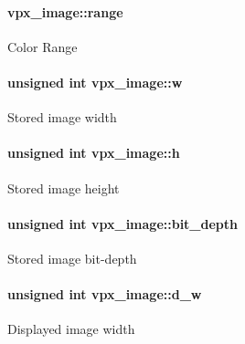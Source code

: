 \paragraph[{\texorpdfstring{range}{range}}]{ vpx\+\_\+image\+::range}\hypertarget{structvpx__image_af451ddd9be4cf49958e253a2b8dd12a9}{}\label{structvpx__image_af451ddd9be4cf49958e253a2b8dd12a9}
Color Range 
\paragraph[{\texorpdfstring{w}{w}}]{\setlength{\rightskip}{0pt plus 5cm}unsigned int vpx\+\_\+image\+::w}\hypertarget{structvpx__image_ac7b7d569142f878155b28141653adcd6}{}\label{structvpx__image_ac7b7d569142f878155b28141653adcd6}
Stored image width 
\paragraph[{\texorpdfstring{h}{h}}]{\setlength{\rightskip}{0pt plus 5cm}unsigned int vpx\+\_\+image\+::h}\hypertarget{structvpx__image_a9d1070804dfe08cd5becd68d597fee69}{}\label{structvpx__image_a9d1070804dfe08cd5becd68d597fee69}
Stored image height 
\paragraph[{\texorpdfstring{bit\+\_\+depth}{bit_depth}}]{\setlength{\rightskip}{0pt plus 5cm}unsigned int vpx\+\_\+image\+::bit\+\_\+depth}\hypertarget{structvpx__image_aac11754e8f8e4fb9e7b3a721ce8be0f1}{}\label{structvpx__image_aac11754e8f8e4fb9e7b3a721ce8be0f1}
Stored image bit-\/depth 
\paragraph[{\texorpdfstring{d\+\_\+w}{d_w}}]{\setlength{\rightskip}{0pt plus 5cm}unsigned int vpx\+\_\+image\+::d\+\_\+w}\hypertarget{structvpx__image_a806bf23143bf00a0b3fdbd6ba030c483}{}\label{structvpx__image_a806bf23143bf00a0b3fdbd6ba030c483}
Displayed image width 

